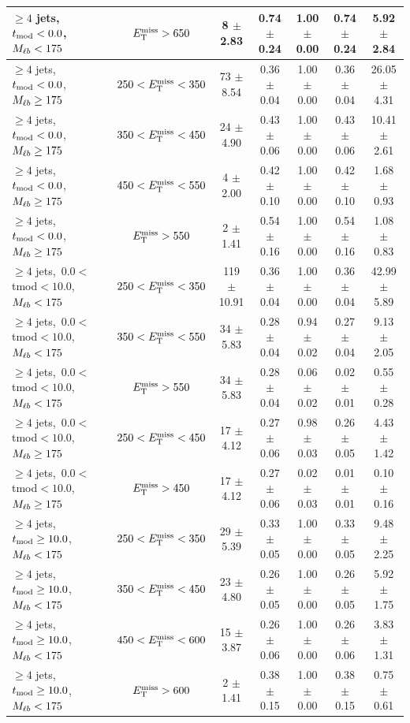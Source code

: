 \begin{table}
\begin{tabular}{|l|c|c|c|c|c|c|}
 $\ge4$ jets,~$t_\text{mod} <0.0$,~$M_{\ell b} <175$ & $E_\text{T}^\text{miss}>650$  & 8 $\pm$ 2.83  & 0.74 $\pm$ 0.24  & 1.00 $\pm$ 0.00 & 0.74 $\pm$ 0.24  & 5.92 $\pm$ 2.84  \\
\hline
 $\ge4$ jets,~$t_\text{mod} <0.0$,~$M_{\ell b} \ge175$ & $250<E_\text{T}^\text{miss}<350$  & 73 $\pm$ 8.54  & 0.36 $\pm$ 0.04  & 1.00 $\pm$ 0.00 & 0.36 $\pm$ 0.04  & 26.05 $\pm$ 4.31  \\
 $\ge4$ jets,~$t_\text{mod} <0.0$,~$M_{\ell b} \ge175$ & $350<E_\text{T}^\text{miss}<450$  & 24 $\pm$ 4.90  & 0.43 $\pm$ 0.06  & 1.00 $\pm$ 0.00 & 0.43 $\pm$ 0.06  & 10.41 $\pm$ 2.61  \\
 $\ge4$ jets,~$t_\text{mod} <0.0$,~$M_{\ell b} \ge175$ & $450<E_\text{T}^\text{miss}<550$  & 4 $\pm$ 2.00  & 0.42 $\pm$ 0.10  & 1.00 $\pm$ 0.00 & 0.42 $\pm$ 0.10  & 1.68 $\pm$ 0.93  \\
 $\ge4$ jets,~$t_\text{mod} <0.0$,~$M_{\ell b} \ge175$ & $E_\text{T}^\text{miss}>550$  & 2 $\pm$ 1.41  & 0.54 $\pm$ 0.16  & 1.00 $\pm$ 0.00 & 0.54 $\pm$ 0.16  & 1.08 $\pm$ 0.83  \\
\hline
 $\ge4$ jets,~$0.0<$tmod$<10.0$,~$M_{\ell b} <175$ & $250<E_\text{T}^\text{miss}<350$  & 119 $\pm$ 10.91  & 0.36 $\pm$ 0.04  & 1.00 $\pm$ 0.00 & 0.36 $\pm$ 0.04  & 42.99 $\pm$ 5.89  \\
 $\ge4$ jets,~$0.0<$tmod$<10.0$,~$M_{\ell b} <175$ & $350<E_\text{T}^\text{miss}<550$  & 34 $\pm$ 5.83  & 0.28 $\pm$ 0.04  & 0.94 $\pm$ 0.02 & 0.27 $\pm$ 0.04  & 9.13 $\pm$ 2.05  \\
 $\ge4$ jets,~$0.0<$tmod$<10.0$,~$M_{\ell b} <175$ & $E_\text{T}^\text{miss}>550$  & 34 $\pm$ 5.83  & 0.28 $\pm$ 0.04  & 0.06 $\pm$ 0.02 & 0.02 $\pm$ 0.01  & 0.55 $\pm$ 0.28  \\
\hline
 $\ge4$ jets,~$0.0<$tmod$<10.0$,~$M_{\ell b} \ge175$ & $250<E_\text{T}^\text{miss}<450$  & 17 $\pm$ 4.12  & 0.27 $\pm$ 0.06  & 0.98 $\pm$ 0.03 & 0.26 $\pm$ 0.05  & 4.43 $\pm$ 1.42  \\
 $\ge4$ jets,~$0.0<$tmod$<10.0$,~$M_{\ell b} \ge175$ & $E_\text{T}^\text{miss}>450$  & 17 $\pm$ 4.12  & 0.27 $\pm$ 0.06  & 0.02 $\pm$ 0.03 & 0.01 $\pm$ 0.01  & 0.10 $\pm$ 0.16  \\
\hline
 $\ge4$ jets,~$t_\text{mod} \ge10.0$,~$M_{\ell b} <175$ & $250<E_\text{T}^\text{miss}<350$  & 29 $\pm$ 5.39  & 0.33 $\pm$ 0.05  & 1.00 $\pm$ 0.00 & 0.33 $\pm$ 0.05  & 9.48 $\pm$ 2.25  \\
 $\ge4$ jets,~$t_\text{mod} \ge10.0$,~$M_{\ell b} <175$ & $350<E_\text{T}^\text{miss}<450$  & 23 $\pm$ 4.80  & 0.26 $\pm$ 0.05  & 1.00 $\pm$ 0.00 & 0.26 $\pm$ 0.05  & 5.92 $\pm$ 1.75  \\
 $\ge4$ jets,~$t_\text{mod} \ge10.0$,~$M_{\ell b} <175$ & $450<E_\text{T}^\text{miss}<600$  & 15 $\pm$ 3.87  & 0.26 $\pm$ 0.06  & 1.00 $\pm$ 0.00 & 0.26 $\pm$ 0.06  & 3.83 $\pm$ 1.31  \\
 $\ge4$ jets,~$t_\text{mod} \ge10.0$,~$M_{\ell b} <175$ & $E_\text{T}^\text{miss}>600$  & 2 $\pm$ 1.41  & 0.38 $\pm$ 0.15  & 1.00 $\pm$ 0.00 & 0.38 $\pm$ 0.15  & 0.75 $\pm$ 0.61  \\

\end{tabular}
\end{table}
